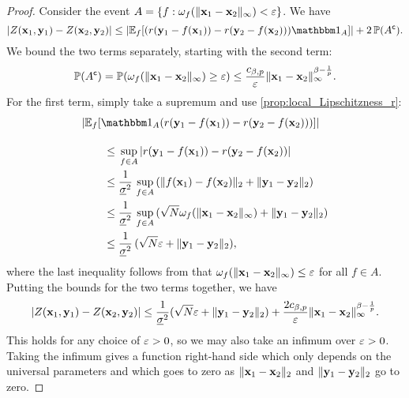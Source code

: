 \documentclass[12pt]{report}
\begin{document}
\begin{proof}
    Consider the event $A = \{f : 
        \omega_f(\lVert\mathbf{x}_1 - \mathbf{x}_2\rVert_\infty) < \varepsilon
    \}$.
    We have
    \begin{equation}
        \abs{Z(\vx_1, \vy_1) - Z(\vx_2, \vy_2)}
         \le 
            \abs{\E_f[
                (
                    r(\vy_1 - f(\vx_1)) 
                    - r(\vy_2 - f(\vx_2)) 
                ) \ind_A
            ]}
            + 2\, \P(A^\c).
    \end{equation}
    We bound the two terms separately, starting with the second term:
    \begin{equation}
        \P(A^\c)
        =
            \P(\omega_f(\norm{\vx_1 - \vx_2}_\infty) \ge \e)
        \le 
        \frac{c_{\beta, p}}{\e} \norm{\vx_1 - \vx_2}_\infty^{\beta - \frac{1}{p}}.
    \end{equation}
    For the first term, simply take a supremum and use \cref{prop:local_Lipschitzness_r}:
    \begin{align}
        &\abs{\E_f[
            \ind_A
            (
                r(\vy_1 - f(\vx_1)) 
                - r(\vy_2 - f(\vx_2)) 
            ) 
        ]}
        \vphantom{\frac{}{\underline{\sigma}^2}}
        \nonumber \\
        &\qquad \le 
            \vphantom{\frac{1}{\underline{\sigma}^2}}
            \sup_{f \in A} \, 
                \abs{
                    r(\vy_1 - f(\vx_1)) 
                    - r(\vy_2 - f(\vx_2)) 
                } \\
        &\qquad \le 
            \frac{1}{\underline{\sigma}^2}\, \sup_{f \in A} \, 
                (\norm{f(\vx_1) - f(\vx_2)}_2 + \norm{\vy_1 - \vy_2}_2) \\
        &\qquad \le 
            \frac{1}{\underline{\sigma}^2}\, \sup_{f \in A} \, 
                (\sqrt{N}\omega_f(\norm{\vx_1 - \vx_2}_\infty) + \norm{\vy_1 - \vy_2}_2) \\
        &\qquad \le 
            \frac{1}{\underline{\sigma}^2}\,
                (\sqrt{N} \e + \norm{\vy_1 - \vy_2}_2),
    \end{align}
    where the last inequality follows from that $\omega_f(\lVert\mathbf{x}_1 - \mathbf{x}_2\rVert_\infty) \le \varepsilon$ for all $f \in A$.
    Putting the bounds for the two terms together, we have
    \begin{equation}
        \lvert Z(\mathbf{x}_1, \mathbf{y}_1) - Z(\mathbf{x}_2, \mathbf{y}_2)\rvert
        \le 
            \frac{1}{\underline{\sigma}^2}(\sqrt{N}\varepsilon + \lVert\mathbf{y}_1 - \mathbf{y}_2\rVert_2)
            + \frac{2 c_{\beta, p}}{\varepsilon} \lVert\mathbf{x}_1 - \mathbf{x}_2\rVert_\infty^{\beta - \frac{1}{p}}.
    \end{equation}
    This holds for any choice of $\varepsilon > 0$, so we may also take an infimum over $\varepsilon > 0$.
    Taking the infimum gives a function right-hand side which only depends on the universal parameters
    and which goes to zero as 
    $\lVert\mathbf{x}_1 - \mathbf{x}_2\rVert_2$ and $\lVert\mathbf{y}_1 - \mathbf{y}_2\rVert_2$ go to zero.
\end{proof}
\end{document}
